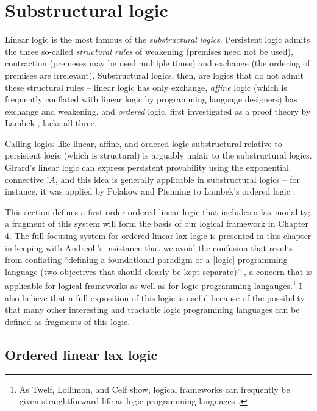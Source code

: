 \chapter{Substructural logic}

Linear logic is the most famous of the {\it substructural logics}.
Persistent logic admits the three so-called {\it structural rules} of
weakening (premises need not be used), contraction (premeses may be
used multiple times) and exchange (the ordering of premises are 
irrelevant). Substructural logics, then, are logics that do not admit
these structural rules -- linear logic has only exchange, 
{\it affine} logic (which is frequently conflated with linear logic
by programming language designers) has exchange and weakening, and
{\it ordered} logic, first investigated as a proof theory by Lambek
\cite{lambek58mathematics}, lacks all three. 

Calling logics like linear, affine, and ordered logic
\underline{sub}structural relative to persistent logic (which is
structural) is arguably unfair to the substructural logics. Girard's
linear logic can express persistent provability using the exponential
connective ${!}A$, and this idea is generally applicable in
substructural logics -- for instance, it was applied by Polakow and
Pfenning to Lambek's ordered logic
\cite{polakow99natural}. 

This section defines a first-order ordered linear logic that includes
a lax modality; a fragment of this system will form the basis of our
logical framework in Chapter 4. The full focusing system for ordered
linear lax logic is presented in this chapter in keeping with
Andreoli's insistance that we avoid the confusion that results from
conflating ``defining a foundational paradigm or a [logic] programming
language (two objectives that should clearly be kept separate)''
\cite{andreoli01focussing}, a concern that is applicable for logical
frameworks as well as for logic programming
langauges.\footnote{As Twelf, Lollimon, and Celf
  show, logical frameworks can frequently be given straightforward
  life as logic programming languages
  \cite{pfenning99system,lopez05monadic,schacknielsen08celf}.} I 
also believe that a full exposition of this logic is useful because
of the possibility that many other interesting and tractable logic
programming languages can be defined as fragments of this logic.

\section{Ordered linear lax logic}

